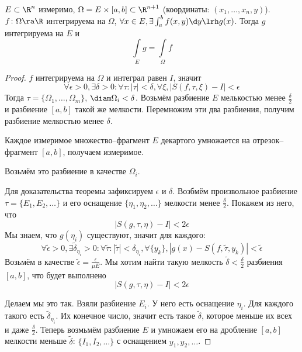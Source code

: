 \begin{theorem}
	$E \subset \R^n$ измеримо, $\Omega = E \times [a, b] \subset \R^{n+1}$ (координаты: $(x_1, \dots, x_n, y)$).
	$f\colon \Omega \ra \R$ интегрируема на $\Omega$, $\forall x \in E, \exists \int_a^b f(x,y) \d y \lrh g(x)$.
	Тогда $g$ интегрируема на $E$ и
	\[ \int\limits_E g = \int\limits_\Omega f \]
\end{theorem}
\begin{proof}
	$f$ интегрируема на $\Omega$ и интеграл равен $I$, значит
	\[
		\forall \epsilon > 0, \exists \delta > 0\colon \forall \tau\colon |\tau| < \delta,
		\forall \xi, \left|S(f,\tau,\xi) - I\right| < \epsilon
	\]
	Тогда $\tau = \{\Omega_1, \dots, \Omega_m\}$, $\diam \Omega_i < \delta$.
	Возьмём разбиение $E$ мелькостью менее $\frac\delta2$ и разбиение $[a, b]$ такой же мелкости.
	Перемножим эти два разбиения, получим разбиение мелкостью менее $\delta$.
	\begin{Rem}
		Каждое измеримое множество--фрагмент $E$ декартого умножается на отрезок--фрагмент $[a, b]$, получаем измеримое.
	\end{Rem}
	Возьмём это разбиение в качестве $\Omega_i$.

	Для доказательства теоремы зафиксируем $\epsilon$ и $\delta$.
	Возбмём произвольное разбиение $\tau = \{E_1, E_2, \dots\}$ и его оснащение $\{\eta_1, \eta_2, \dots\}$ мелкости менее $\frac\delta2$.
	Покажем из него, что
	\[
		\left| S(g, \tau, \eta) - I \right| < 2\epsilon
	\]
	Мы знаем, что $g(\eta_i)$ существуют, значит для каждого:
	\[
		\forall \tilde\epsilon>0, \exists \tilde\delta_{\eta_i} > 0\colon \forall \tilde\tau\colon |\tilde\tau| < \delta_{\eta_i},
		\forall \{y_k\}, \left| g(x) - S(f, \tilde\tau, y_k) \right| < \tilde\epsilon
	\]
	Возьмём в качестве $\tilde\epsilon = \frac\epsilon{\mu E}$.
	Мы хотим найти такую мелкость $\tilde\delta < \frac\delta2$ разбиения $[a, b]$, что будет выполнено
	\[
		\left| S(g, \tau, \eta) - I \right| < 2\epsilon
	\]

	Делаем мы это так.
	Взяли разбиение $E_i$.
	У него есть оснащение $\eta_i$.
	Для каждого такого есть $\tilde\delta_{\eta_i}$.
	Их конечное число, значит есть такое $\tilde\delta$, которое меньше их всех и даже $\frac\delta2$.
	Теперь возмьмём разбиение $E$ и умножаем его на дробление $[a, b]$ мелкости меньше $\tilde\delta$:
	$\{I_1, I_2, \dots\}$ с оснащением ${y_1, y_2, \dots}$.


\end{proof}
